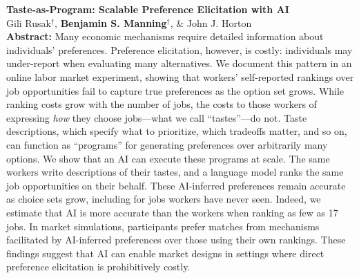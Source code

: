 \documentclass[11pt]{article}
\newenvironment{publist}
  {\begin{list}{}{%
    \setlength{\leftmargin}{1.5em}%
    \setlength{\itemindent}{-1.5em}%
    \setlength{\itemsep}{10pt}%
    \setlength{\parsep}{0pt}%
    \setlength{\topsep}{4pt}}}
  {\end{list}}
\begin{document}
\begin{publist}
\item \textbf{Taste-as-Program: Scalable Preference Elicitation with AI}\\
Gili Rusak$^\dagger$, \textbf{Benjamin S. Manning}$^\dagger$, \& John J. Horton\\[3pt]
{\footnotesize \textbf{Abstract: }Many economic mechanisms require detailed information about individuals' preferences.
Preference elicitation, however, is costly: individuals may under-report when evaluating many alternatives.
We document this pattern in an online labor market experiment, showing that workers' self-reported rankings over job opportunities fail to capture true preferences as the option set grows.
While ranking costs grow with the number of jobs, the costs to those workers of expressing \emph{how} they choose jobs---what we call ``tastes''---do not.
Taste descriptions, which specify what to prioritize, which tradeoffs matter, and so on, can function as ``programs'' for generating preferences over arbitrarily many options.
We show that an AI can execute these programs at scale.
The same workers write descriptions of their tastes, and a language model ranks the same job opportunities on their behalf.
These AI-inferred preferences remain accurate as choice sets grow, including for jobs workers have never seen.
Indeed, we estimate that AI is more accurate than the workers when ranking as few as 17 jobs.
In market simulations, participants prefer matches from mechanisms facilitated by AI-inferred preferences over those using their own rankings.
These findings suggest that AI can enable market designs in settings where direct preference elicitation is prohibitively costly.}
\end{publist}
\end{document}
